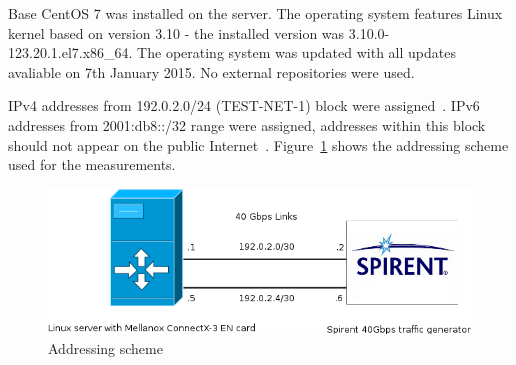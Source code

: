 Base CentOS 7 was installed on the server.
The operating system features Linux kernel based on version 3.10 -
the installed version was 3.10.0-123.20.1.el7.x86\_64.
The operating system was updated with all updates avaliable on 7th January 2015.
No external repositories were used. %

IPv4 addresses from 192.0.2.0/24 (TEST-NET-1) block were assigned~\cite{rfc5737}.
IPv6 addresses from 2001:db8::/32 range were assigned,
addresses within this block should not appear on the public Internet~\cite{rfc3849}.
Figure~\ref{fig:addressing-scheme} shows the addressing scheme used for the measurements.
\begin{figure}[H]
	\centering
	\includegraphics[width=13.5cm,keepaspectratio]{fig/net-setup.png}
	\caption{Addressing scheme}
	\label{fig:addressing-scheme}
\end{figure}








